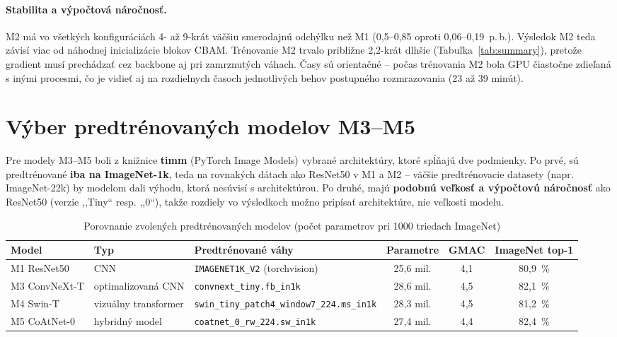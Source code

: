 \paragraph{Stabilita a výpočtová náročnosť.} M2 má vo všetkých
konfiguráciách 4- až 9-krát väčšiu smerodajnú odchýlku než M1 (0,5--0,85
oproti 0,06--0,19~p.\,b.). Výsledok M2 teda závisí viac od náhodnej
inicializácie blokov CBAM. Trénovanie M2 trvalo približne 2,2-krát dlhšie
(Tabuľka~\ref{tab:summary}), pretože gradient musí prechádzať cez backbone
aj pri zamrznutých váhach. Časy sú orientačné -- počas trénovania M2 bola
GPU čiastočne zdieľaná s inými procesmi, čo je vidieť aj na rozdielnych
časoch jednotlivých behov postupného rozmrazovania (23 až 39 minút).

\section{Výber predtrénovaných modelov M3--M5}
\label{sec:vyber}

Pre modely M3--M5 boli z knižnice \textbf{timm} (PyTorch Image Models)
vybrané architektúry, ktoré spĺňajú dve podmienky. Po prvé, sú
predtrénované \textbf{iba na ImageNet-1k}, teda na rovnakých dátach ako
ResNet50 v M1 a M2 -- väčšie predtrénovacie datasety (napr. ImageNet-22k)
by modelom dali výhodu, ktorá nesúvisí s architektúrou. Po druhé, majú
\textbf{podobnú veľkosť a výpočtovú náročnosť} ako ResNet50 (verzie
,,Tiny`` resp. ,,0``), takže rozdiely vo výsledkoch možno pripísať
architektúre, nie veľkosti modelu.

\begin{table}[H]
    \centering
    \caption{Porovnanie zvolených predtrénovaných modelov (počet parametrov pri 1000 triedach ImageNet)}
    \label{tab:vyber}
    \footnotesize
    \begin{tabular}{lllccc}
        \toprule
        Model & Typ & Predtrénované váhy & Parametre & GMAC & ImageNet top-1 \\
        \midrule
        M1 ResNet50    & CNN & \texttt{IMAGENET1K\_V2} (torchvision) & 25,6 mil. & 4,1 & 80,9~\% \\
        M3 ConvNeXt-T  & optimalizovaná CNN & \texttt{convnext\_tiny.fb\_in1k} & 28,6 mil. & 4,5 & 82,1~\% \\
        M4 Swin-T      & vizuálny transformer & \texttt{swin\_tiny\_patch4\_window7\_224.ms\_in1k} & 28,3 mil. & 4,5 & 81,2~\% \\
        M5 CoAtNet-0   & hybridný model & \texttt{coatnet\_0\_rw\_224.sw\_in1k} & 27,4 mil. & 4,4 & 82,4~\% \\
        \bottomrule
    \end{tabular}
\end{table}


